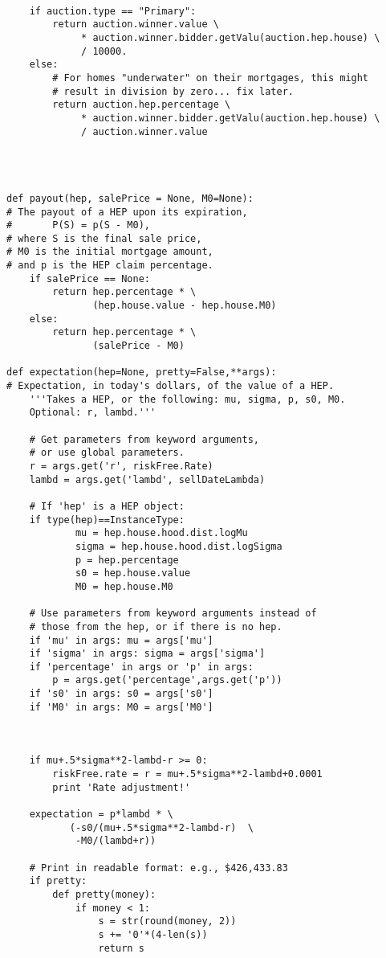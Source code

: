 \begin{lstlisting}
       
    if auction.type == "Primary":
        return auction.winner.value \
             * auction.winner.bidder.getValu(auction.hep.house) \
             / 10000.
    else:
        # For homes "underwater" on their mortgages, this might
        # result in division by zero... fix later.
        return auction.hep.percentage \
             * auction.winner.bidder.getValu(auction.hep.house) \
             / auction.winner.value
    
    
    

def payout(hep, salePrice = None, M0=None):
# The payout of a HEP upon its expiration,
#       P(S) = p(S - M0),
# where S is the final sale price,
# M0 is the initial mortgage amount,
# and p is the HEP claim percentage.
    if salePrice == None:
        return hep.percentage * \
               (hep.house.value - hep.house.M0)
    else:
        return hep.percentage * \
               (salePrice - M0)

def expectation(hep=None, pretty=False,**args):
# Expectation, in today's dollars, of the value of a HEP.
    '''Takes a HEP, or the following: mu, sigma, p, s0, M0.
    Optional: r, lambd.'''
    
    # Get parameters from keyword arguments,
    # or use global parameters.
    r = args.get('r', riskFree.Rate)
    lambd = args.get('lambd', sellDateLambda)

    # If 'hep' is a HEP object:
    if type(hep)==InstanceType:
            mu = hep.house.hood.dist.logMu
            sigma = hep.house.hood.dist.logSigma
            p = hep.percentage
            s0 = hep.house.value
            M0 = hep.house.M0

    # Use parameters from keyword arguments instead of
    # those from the hep, or if there is no hep.
    if 'mu' in args: mu = args['mu']
    if 'sigma' in args: sigma = args['sigma']
    if 'percentage' in args or 'p' in args:
        p = args.get('percentage',args.get('p'))
    if 's0' in args: s0 = args['s0']
    if 'M0' in args: M0 = args['M0']

    
            
    if mu+.5*sigma**2-lambd-r >= 0:
        riskFree.rate = r = mu+.5*sigma**2-lambd+0.0001
        print 'Rate adjustment!'
        
    expectation = p*lambd * \
           (-s0/(mu+.5*sigma**2-lambd-r)  \
            -M0/(lambd+r))

    # Print in readable format: e.g., $426,433.83
    if pretty:
        def pretty(money):
            if money < 1:
                s = str(round(money, 2))
                s += '0'*(4-len(s))
                return s
            

\end{lstlisting}
